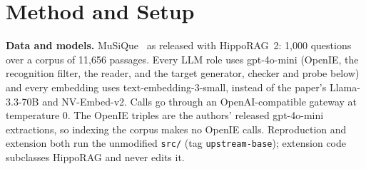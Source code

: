 \section{Method and Setup}\label{sec:method}

\textbf{Data and models.} MuSiQue~\cite{trivedi2022musique} as released with HippoRAG~2: 1,000 questions over a corpus
of 11,656 passages. Every LLM role uses gpt-4o-mini (OpenIE, the recognition filter, the reader, and the target
generator, checker and probe below) and every embedding uses text-embedding-3-small, instead of the paper's
Llama-3.3-70B and NV-Embed-v2. Calls go through an OpenAI-compatible gateway at temperature 0. The OpenIE triples are
the authors' released gpt-4o-mini extractions, so indexing the corpus makes no OpenIE calls. Reproduction and
extension both run the unmodified \texttt{src/} (tag \texttt{upstream-base}); extension code subclasses HippoRAG and
never edits it.

